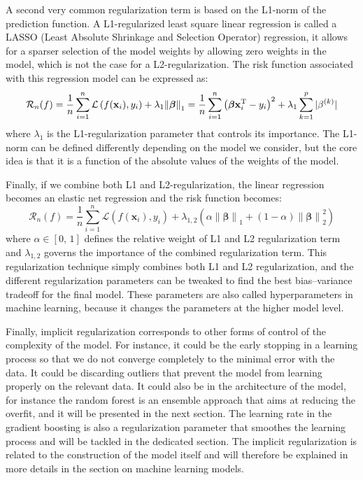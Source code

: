 \documentclass[main]{subfiles}
\begin{document}
A second very common regularization term is based on the L1-norm of the prediction function. A L1-regularized least square linear regression is called a LASSO (Least Absolute Shrinkage and Selection Operator) regression, it allows for a sparser selection of the model weights by allowing zero weights in the model, which is not the case for a L2-regularization. The risk function associated with this regression model can be expressed as:
\begin{equation}\label{eq:L1_reg}
  \mathcal{R}_n(f) = \frac{1}{n}\sum_{i=1}^n \mathcal{L}\left(f(\mathbf{x}_i),y_i\right) + \lambda_1{\lVert \boldsymbol{\beta} \rVert}_1 = \frac{1}{n}\sum_{i=1}^n {\left(\boldsymbol{\beta}\mathbf{x}_i^{\text{T}}-y_i\right)}^2 + \lambda_1 \sum_{k=1}^p |\beta^{(k)}|
\end{equation}
where $\lambda_1$ is the L1-regularization parameter that controls its importance. The L1-norm can be defined differently depending on the model we consider, but the core idea is that it is a function of the absolute values of the weights of the model. 

Finally, if we combine both L1 and L2-regularization, the linear regression becomes an elastic net regression and the risk function becomes:
\begin{equation}\label{eq:elasticnet_reg}
  \mathcal{R}_n(f) = \frac{1}{n}\sum_{i=1}^n \mathcal{L}\left(f(\mathbf{x}_i),y_i\right) + \lambda_{1,2} \left({\alpha \lVert \boldsymbol{\beta} \rVert }_1 + (1-\alpha) {\lVert \boldsymbol{\beta} \rVert}_2^2\right)
\end{equation}
where $\alpha\in[0,\,1]$ defines the relative weight of L1 and L2 regularization term and $\lambda_{1,2}$ governs the importance of the combined regularization term. This regularization technique simply combines both L1 and L2 regularization, and the different regularization parameters can be tweaked to find the best bias--variance tradeoff for the final model. These parameters are also called hyperparameters in machine learning, because it changes the parameters at the higher model level.

Finally, implicit regularization corresponds to other forms of control of the complexity of the model. For instance, it could be the early stopping in a learning process so that we do not converge completely to the minimal error with the data. It could be discarding outliers that prevent the model from learning properly on the relevant data. It could also be in the architecture of the model, for instance the random forest is an ensemble approach that aims at reducing the overfit, and it will be presented in the next section. The learning rate in the gradient boosting is also a regularization parameter that smoothes the learning process and will be tackled in the dedicated section. The implicit regularization is related to the construction of the model itself and will therefore be explained in more details in the section on machine learning models.
\end{document}
